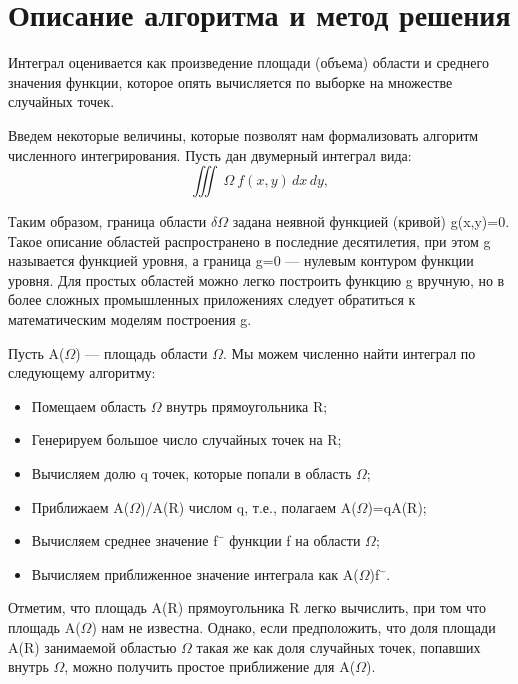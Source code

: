 \documentclass{report}
\begin{document}
\section*{Описание алгоритма и метод решения}
Интеграл оценивается как произведение площади (объема) области и среднего значения функции, которое опять вычисляется по выборке на множестве случайных точек.
\par Введем некоторые величины, которые позволят нам формализовать алгоритм
численного интегрирования. Пусть дан двумерный интеграл вида:
$$\iiint\ \Omega \ f(x,y) \,dx\,dy, $$
\par Таким образом, граница области $\delta \Omega$ задана неявной функцией (кривой) g(x,y)=0. Такое
описание областей распространено в последние десятилетия, при этом g называется функцией уровня, а граница g=0 — нулевым контуром функции уровня. Для простых областей можно легко построить функцию g вручную, но в более сложных промышленных приложениях следует обратиться к математическим моделям построения g.
\par Пусть A($\Omega$) — площадь области $\Omega$. Мы можем численно найти интеграл по следующему алгоритму:
\begin{itemize}
\item Помещаем область $\Omega$ внутрь прямоугольника R;
\item Генерируем большое число случайных точек на R;
\item Вычисляем долю q точек, которые попали в область $\Omega$;
\item Приближаем A($\Omega$)/A(R) числом q, т.е., полагаем A($\Omega$)=qA(R);
\item Вычисляем среднее значение f¯ функции f на области $\Omega$;
\item Вычисляем приближенное значение интеграла как A($\Omega$)f¯.
\end{itemize}
\par Отметим, что площадь A(R) прямоугольника R легко вычислить, при том что площадь
A($\Omega$) нам не известна. Однако, если предположить, что доля площади A(R) занимаемой
областью $\Omega$ такая же как доля случайных точек, попавших внутрь $\Omega$, можно получить
простое приближение для A($\Omega$).

\newpage

\end{document}
